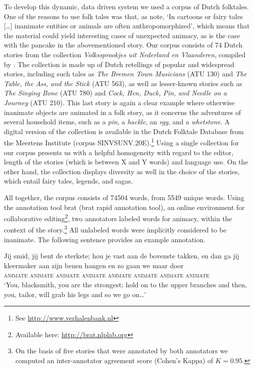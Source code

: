 \documentclass[a4paper,UKenglish]{oasics}
\begin{document}
To develop this dynamic, data driven system we used a corpus of Dutch
folktales. One of the reasons to use folk tales was that, as
\cite{vogels:13} note, `In cartoons or fairy tales [\ldots] inanimate
entities or animals are often anthropomorphized', which means that the
material could yield interesting cases of unexpected animacy, as is
the case with the pancake in the abovementioned story. Our corpus
consists of 74 Dutch stories from the collection
\textit{Volkssprookjes uit Nederland en Vlaanderen}, compiled by
\cite{sinninghe:78}. The collection is made up of Dutch retellings of
popular and widespread stories, including such tales as \textit{The
  Bremen Town Musicians} (ATU 130) and \textit{The Table, the Ass, and
  the Stick } (ATU 563), as well as lesser-known stories such as
\textit{The Singing Bone} (ATU 780) and \textit{Cock, Hen, Duck, Pin,
  and Needle on a Journey} (ATU 210). This last story is again a clear
example where otherwise inanimate objects are animated in a folk
story, as it concerns the adventures of several household items, such
as a \textit{pin}, a \textit{hackle}, an \textit{egg}, and a
\textit{whetstone}. A digital version of the collection is available
in the Dutch Folktale Database from the Meertens Institute (corpus
SINVSUNV.20E).\footnote{See \url{http://www.verhalenbank.nl}} Using a
single collection for our corpus presents us with a helpful
homogeneity with regard to the editor, length of the stories (which is
between X and Y words) and language use. On the other hand, the
collection displays diversity as well in the choice of the stories,
which entail fairy tales, legends, and sagas.

All together, the corpus consists of 74504 words, from 5549 unique
words. Using the annotation tool brat (brat rapid annotation tool), an
online environment for collaborative editing\footnote{Available here:
  \url{http://brat.nlplab.org}}, two annotators labeled words for
animacy, within the context of the story.\footnote{On the basis of
  five stories that were annotated by both annotators we computed an
  inter-annotator agreement score (Cohen's Kappa) of $K=0.95$.} All
unlabeled words were implicitly considered to be inanimate. The
following sentence provides an example annotation.
\begin{exe}
\ex
\gll Jij smid, jij bent de sterkste; hou je vast aan de bovenste
takken, en dan ga jij kleermaker aan zijn benen hangen en zo gaan we maar door\\
    \textsc{animate} \textsc{animate} \textsc{animate} {} {} {} {} \textsc{animate} {} {} {} {} {} {} {} {} \textsc{animate} \textsc{animate}
    {} \textsc{animate} {} {} {} {} {} \textsc{animate} {} {} \\
\trans `You, blacksmith, you are the strongest; hold on to the upper
branches and then, you, tailor, will grab his legs and so we go on\ldots'
\end{exe}
\end{document}
